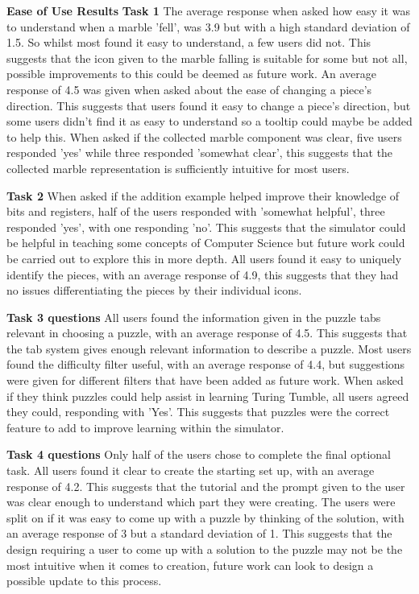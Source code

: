 \documentclass{l4proj}
\begin{document}
\textbf{Ease of Use Results}
\textbf{Task 1}
The average response when asked how easy it was to understand when a marble 'fell', was 3.9 but with a high standard deviation of 1.5. So whilst most found it easy to understand, a few users did not. This suggests that the icon given to the marble falling is suitable for some but not all, possible improvements to this could be deemed as future work. An average response of 4.5 was given when asked about the ease of changing a piece's direction. This suggests that users found it easy to change a piece's direction, but some users didn't find it as easy to understand so a tooltip could maybe be added to help this. When asked if the collected marble component was clear, five users responded 'yes' while three responded 'somewhat clear', this suggests that the collected marble representation is sufficiently intuitive for most users.

\textbf{Task 2}
When asked if the addition example helped improve their knowledge of bits and registers, half of the users responded with 'somewhat helpful', three responded 'yes', with one responding 'no'. This suggests that the simulator could be helpful in teaching some concepts of Computer Science but future work could be carried out to explore this in more depth. All users found it easy to uniquely identify the pieces, with an average response of 4.9, this suggests that they had no issues differentiating the pieces by their individual icons.

\textbf{Task 3 questions}
All users found the information given in the puzzle tabs relevant in choosing a puzzle, with an average response of 4.5. This suggests that the tab system gives enough relevant information to describe a puzzle. Most users found the difficulty filter useful, with an average response of 4.4, but suggestions were given for different filters that have been added as future work. When asked if they think puzzles could help assist in learning Turing Tumble, all users agreed they could, responding with 'Yes'. This suggests that puzzles were the correct feature to add to improve learning within the simulator.

\textbf{Task 4 questions}
Only half of the users chose to complete the final optional task. All users found it clear to create the starting set up, with an average response of 4.2. This suggests that the tutorial and the prompt given to the user was clear enough to understand which part they were creating. The users were split on if it was easy to come up with a puzzle by thinking of the solution, with an average response of 3 but a standard deviation of 1. This suggests that the design requiring a user to come up with a solution to the puzzle may not be the most intuitive when it comes to creation, future work can look to design a possible update to this process.
\end{document}
